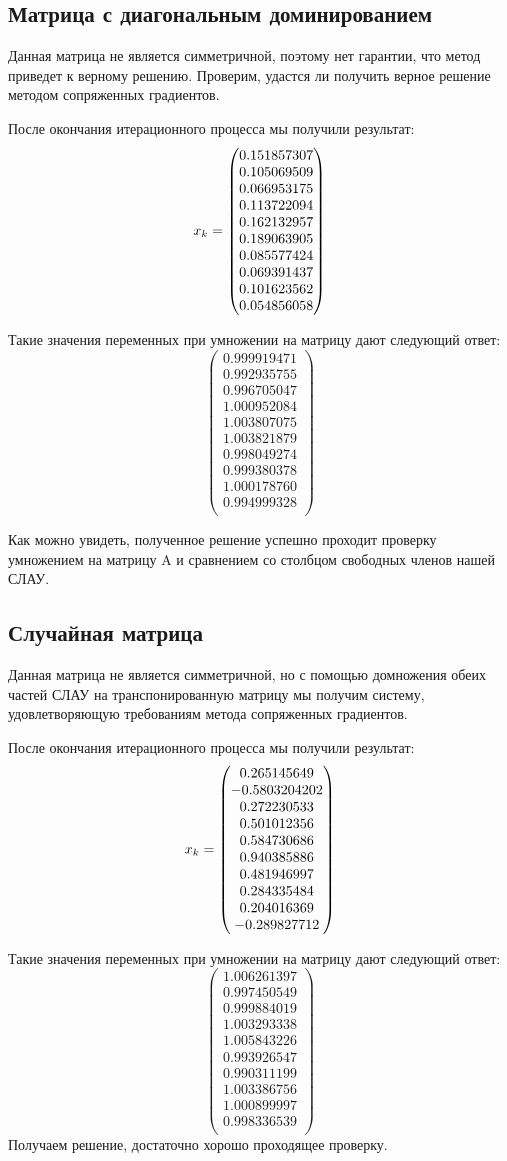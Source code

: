 \documentclass[../../report.tex]{subfiles}
\begin{document}
\subsection{Матрица с диагональным доминированием}
Данная матрица не является симметричной, поэтому нет гарантии, что метод приведет к верному
решению. Проверим, удастся ли получить верное решение методом сопряженных градиентов.

После окончания итерационного процесса мы получили результат:
\[
x_{k} = \begin{pmatrix} 0.151857307 \\ 0.105069509 \\ 0.066953175 \\ 0.113722094 \\ 0.162132957 \\ 0.189063905 \\ 0.085577424 \\ 0.069391437 \\ 0.101623562 \\ 0.054856058 \\ \end{pmatrix}
\]

Такие значения переменных при умножении на матрицу дают следующий ответ:
\[
\begin{pmatrix}
    0.999919471 \\
    0.992935755 \\
    0.996705047 \\
    1.000952084 \\
    1.003807075 \\
    1.003821879 \\
    0.998049274 \\
    0.999380378 \\
    1.000178760 \\
    0.994999328 \\
\end{pmatrix}
\]

Как можно увидеть, полученное решение успешно проходит проверку умножением на матрицу A
и сравнением со столбцом свободных членов нашей СЛАУ.

\subsection{Случайная матрица}
Данная матрица не является симметричной, но с помощью домножения обеих частей СЛАУ на транспонированную матрицу
мы получим систему, удовлетворяющую требованиям метода сопряженных градиентов.

После окончания итерационного процесса мы получили результат:
\[
x_{k} = \begin{pmatrix} 0.265145649 \\ -0.5803204202 \\ 0.272230533 \\ 0.501012356 \\ 0.584730686 \\ 0.940385886 \\ 0.481946997 \\ 0.284335484 \\ 0.204016369 \\ -0.289827712 \\ \end{pmatrix}
\]

Такие значения переменных при умножении на матрицу дают следующий ответ:
\[
\begin{pmatrix}
    1.006261397 \\
    0.997450549 \\
    0.999884019 \\
    1.003293338 \\
    1.005843226 \\
    0.993926547 \\
    0.990311199 \\
    1.003386756 \\
    1.000899997 \\
    0.998336539 \\
\end{pmatrix}
\]
Получаем решение, достаточно хорошо проходящее проверку.
\end{document}
